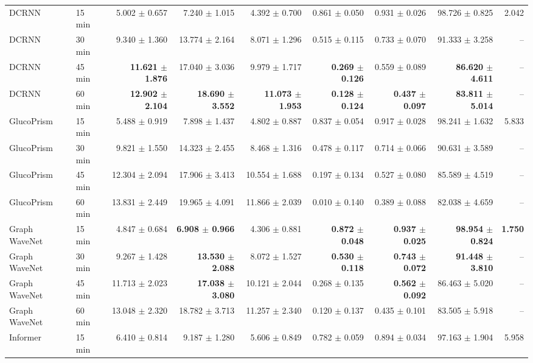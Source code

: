 \begin{table}[!t]
{\begin{tabular}{llrrrrrrr}
\midrule
DCRNN & 15 min & 5.002 $\pm$ 0.657 & 7.240 $\pm$ 1.015 & 4.392 $\pm$ 0.700 & 0.861 $\pm$ 0.050 & 0.931 $\pm$ 0.026 & 98.726 $\pm$ 0.825 & 2.042 \\
DCRNN & 30 min & 9.340 $\pm$ 1.360 & 13.774 $\pm$ 2.164 & 8.071 $\pm$ 1.296 & 0.515 $\pm$ 0.115 & 0.733 $\pm$ 0.070 & 91.333 $\pm$ 3.258 & -- \\
DCRNN & 45 min & \textbf{11.621 $\pm$ 1.876} & 17.040 $\pm$ 3.036 & 9.979 $\pm$ 1.717 & \textbf{0.269 $\pm$ 0.126} & 0.559 $\pm$ 0.089 & \textbf{86.620 $\pm$ 4.611} & -- \\
DCRNN & 60 min & \textbf{12.902 $\pm$ 2.104} & \textbf{18.690 $\pm$ 3.552} & \textbf{11.073 $\pm$ 1.953} & \textbf{0.128 $\pm$ 0.124} & \textbf{0.437 $\pm$ 0.097} & \textbf{83.811 $\pm$ 5.014} & -- \\
\midrule
GlucoPrism & 15 min & 5.488 $\pm$ 0.919 & 7.898 $\pm$ 1.437 & 4.802 $\pm$ 0.887 & 0.837 $\pm$ 0.054 & 0.917 $\pm$ 0.028 & 98.241 $\pm$ 1.632 & 5.833 \\
GlucoPrism & 30 min & 9.821 $\pm$ 1.550 & 14.323 $\pm$ 2.455 & 8.468 $\pm$ 1.316 & 0.478 $\pm$ 0.117 & 0.714 $\pm$ 0.066 & 90.631 $\pm$ 3.589 & -- \\
GlucoPrism & 45 min & 12.304 $\pm$ 2.094 & 17.906 $\pm$ 3.413 & 10.554 $\pm$ 1.688 & 0.197 $\pm$ 0.134 & 0.527 $\pm$ 0.080 & 85.589 $\pm$ 4.519 & -- \\
GlucoPrism & 60 min & 13.831 $\pm$ 2.449 & 19.965 $\pm$ 4.091 & 11.866 $\pm$ 2.039 & 0.010 $\pm$ 0.140 & 0.389 $\pm$ 0.088 & 82.038 $\pm$ 4.659 & -- \\
\midrule
Graph WaveNet & 15 min & 4.847 $\pm$ 0.684 & \textbf{6.908 $\pm$ 0.966} & 4.306 $\pm$ 0.881 & \textbf{0.872 $\pm$ 0.048} & \textbf{0.937 $\pm$ 0.025} & \textbf{98.954 $\pm$ 0.824} & \textbf{1.750} \\
Graph WaveNet & 30 min & 9.267 $\pm$ 1.428 & \textbf{13.530 $\pm$ 2.088} & 8.072 $\pm$ 1.527 & \textbf{0.530 $\pm$ 0.118} & \textbf{0.743 $\pm$ 0.072} & \textbf{91.448 $\pm$ 3.810} & -- \\
Graph WaveNet & 45 min & 11.713 $\pm$ 2.023 & \textbf{17.038 $\pm$ 3.080} & 10.121 $\pm$ 2.044 & 0.268 $\pm$ 0.135 & \textbf{0.562 $\pm$ 0.092} & 86.463 $\pm$ 5.020 & -- \\
Graph WaveNet & 60 min & 13.048 $\pm$ 2.320 & 18.782 $\pm$ 3.713 & 11.257 $\pm$ 2.340 & 0.120 $\pm$ 0.137 & 0.435 $\pm$ 0.101 & 83.505 $\pm$ 5.918 & -- \\
\midrule
Informer & 15 min & 6.410 $\pm$ 0.814 & 9.187 $\pm$ 1.280 & 5.606 $\pm$ 0.849 & 0.782 $\pm$ 0.059 & 0.894 $\pm$ 0.034 & 97.163 $\pm$ 1.904 & 5.958 \\

\end{tabular}}
\end{table}
